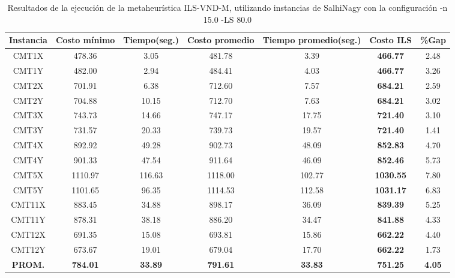\begin{table}[h]
\caption{Resultados de la ejecución de la metaheurística ILS-VND-M, utilizando instancias de SalhiNagy con la configuración -n 15.0 -LS 80.0}
\centering
\small
\begin{tabular}{c c c c c c c}
\hline\hline
Instancia & Costo mínimo & Tiempo(seg.) & Costo promedio & Tiempo promedio(seg.) & Costo ILS & \%Gap \\ [0.5ex]
\hline
CMT1X & 478.36 & 3.05 & 
481.78 & 3.39 & \bf{466.77} & 
2.48\\CMT1Y & 482.00 & 2.94 & 
484.41 & 4.03 & \bf{466.77} & 
3.26\\CMT2X & 701.91 & 6.38 & 
712.60 & 7.57 & \bf{684.21} & 
2.59\\CMT2Y & 704.88 & 10.15 & 
712.70 & 7.63 & \bf{684.21} & 
3.02\\CMT3X & 743.73 & 14.66 & 
747.17 & 17.75 & \bf{721.40} & 
3.10\\CMT3Y & 731.57 & 20.33 & 
739.73 & 19.57 & \bf{721.40} & 
1.41\\CMT4X & 892.92 & 49.28 & 
902.73 & 48.09 & \bf{852.83} & 
4.70\\CMT4Y & 901.33 & 47.54 & 
911.64 & 46.09 & \bf{852.46} & 
5.73\\CMT5X & 1110.97 & 116.63 & 
1118.00 & 102.77 & \bf{1030.55} & 
7.80\\CMT5Y & 1101.65 & 96.35 & 
1114.53 & 112.58 & \bf{1031.17} & 
6.83\\CMT11X & 883.45 & 34.88 & 
898.17 & 36.09 & \bf{839.39} & 
5.25\\CMT11Y & 878.31 & 38.18 & 
886.20 & 34.47 & \bf{841.88} & 
4.33\\CMT12X & 691.35 & 15.08 & 
693.81 & 15.86 & \bf{662.22} & 
4.40\\CMT12Y & 673.67 & 19.01 & 
679.04 & 17.70 & \bf{662.22} & 
1.73\\\bf{PROM.} & 
\bf{784.01} & \bf{33.89} & \bf{791.61} & \bf{33.83} & \bf{751.25} & \bf{4.05}\\[1ex]\hline
\end{tabular}
\label{table:ILS-VND-M-15-80-S}
\end{table}

